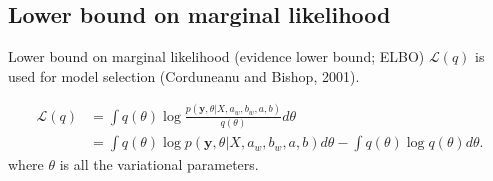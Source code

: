\documentclass[12pt]{amsart}
\begin{document}


\subsection*{Lower bound on marginal likelihood}
Lower bound on marginal likelihood (evidence lower bound; ELBO) $\mathcal{L}(q)$ is used for model selection (Corduneanu and Bishop, 2001).

\begin{align}
\mathcal{L}(q) &= \int q(\theta) \log \frac{p(\boldsymbol{y},\theta|X,a_w, b_w, a, b)}{q(\theta)} d\theta \\
&=\int q(\theta) \log p(\boldsymbol{y},\theta|X,a_w, b_w, a, b) d\theta - \int q(\theta) \log q(\theta) d\theta \label{ELBO}.
\end{align}
where $\theta$ is all the variational parameters.
\end{document}
